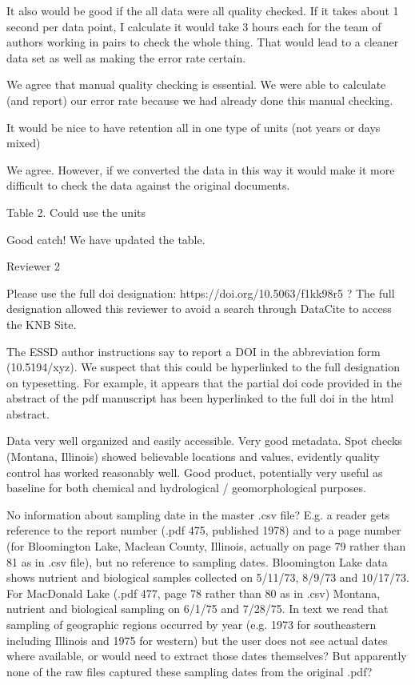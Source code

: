\documentclass{article}
\begin{document}
It also would be good if the all data were all quality checked. If it takes about 1 second per data point, I calculate it would take 3 hours each for the team of authors working in pairs to check the whole thing. That would lead to a cleaner data set as well as making the error rate certain.

We agree that manual quality checking is essential. We were able to calculate (and report) our error rate because we had already done this manual checking.

It would be nice to have retention all in one type of units (not years or days mixed) 

We agree. However, if we converted the data in this way it would make it more difficult to check the data against the original documents. 

Table 2. Could use the units

Good catch! We have updated the table.



Reviewer 2

Please use the full doi designation: https://doi.org/10.5063/f1kk98r5 ? The full designation allowed this reviewer to avoid a search through DataCite to access the KNB Site.

The ESSD author instructions say to report a DOI in the abbreviation form (10.5194/xyz). We suspect that this could be hyperlinked to the full designation on typesetting. For example, it appears that the partial doi code provided in the abstract of the pdf manuscript has been hyperlinked to the full doi in the html abstract.

Data very well organized and easily accessible. Very good metadata. Spot checks (Montana, Illinois) showed believable locations and values, evidently quality control has worked reasonably well. Good product, potentially very useful as baseline for both chemical and hydrological / geomorphological purposes.

No information about sampling date in the master .csv file? E.g. a reader gets reference to the report number (.pdf 475, published 1978) and to a page number (for Bloomington Lake, Maclean County, Illinois, actually on page 79 rather than 81 as in .csv file), but no reference to sampling dates. Bloomington Lake data shows nutrient and biological samples collected on 5/11/73, 8/9/73 and 10/17/73. For MacDonald Lake (.pdf 477, page 78 rather than 80 as in .csv) Montana, nutrient and biological sampling on 6/1/75 and 7/28/75. In text we read that sampling of geographic regions occurred by year (e.g. 1973 for southeastern including Illinois and 1975 for western) but the user does not see actual dates where available, or would need to extract those dates themselves? But apparently none of the raw files captured these sampling dates from the original .pdf?
\end{document}

